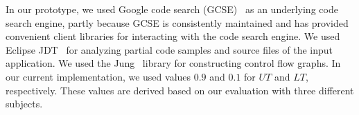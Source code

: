 In our prototype, we used Google code search (GCSE)~\cite{GCSE} as an underlying
code search engine, partly because GCSE is consistently maintained and has
provided convenient client libraries for interacting with the code search engine.
We used Eclipse JDT~\cite{EclipseJDT} for analyzing partial code samples
and source files of the input application. We used the Jung~\cite{Jung} library
for constructing control flow graphs. In our current implementation, we used values
$0.9$ and $0.1$ for $UT$ and $LT$, respectively. These values are derived based on
our evaluation with three different subjects.